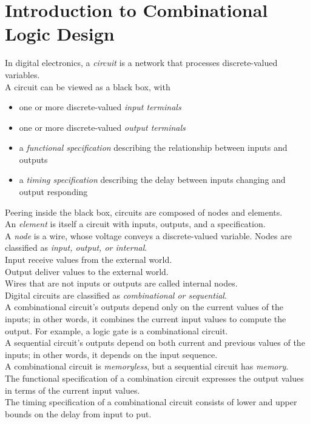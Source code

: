 \documentclass[12pt]{article}
\theoremstyle{definition}
\begin{document}
  \newpage
  \section{Introduction to Combinational Logic Design}
  In digital electronics, a \emph{circuit} is a network that processes discrete-valued variables. \\
  A circuit can be viewed as a black box, with
  \begin{itemize}
    \item one or more discrete-valued \emph{input terminals}
    \item one or more discrete-valued \emph{output terminals}
    \item a \emph{functional specification} describing the relationship between inputs and outputs
    \item a \emph{timing specification} describing the delay between inputs changing and output responding
  \end{itemize}
  Peering inside the black box, circuits are composed of nodes and elements. \\
  An \emph{element} is itself a circuit with inputs, outputs, and a specification. \\
  A \emph{node} is a wire, whose voltage conveys a discrete-valued variable.
  Nodes are classified as \emph{input, output, \emph{or} internal}. \\
  Input receive values from the external world. \\
  Output deliver values to the external world. \\
  Wires that are not inputs or outputs are called internal nodes. \\

  Digital circuits are classified as \emph{combinational \emph{or} sequential}. \\
  A combinational circuit's outputs depend only on the current values of the inputs; in other words, it combines the current input values to compute the output.
  For example, a logic gate is a combinational circuit. \\
  A sequential circuit's outputs depend on both current and previous values of the inputs; in other words, it depends on the input sequence. \\
  A combinational circuit is \emph{memoryless}, but a sequential circuit has \emph{memory}. \\

  The functional specification of a combination circuit expresses the output values in terms of the current input values. \\
  The timing specification of a combinational circuit consists of lower and upper bounds on the delay from input to put. \\
\end{document}
